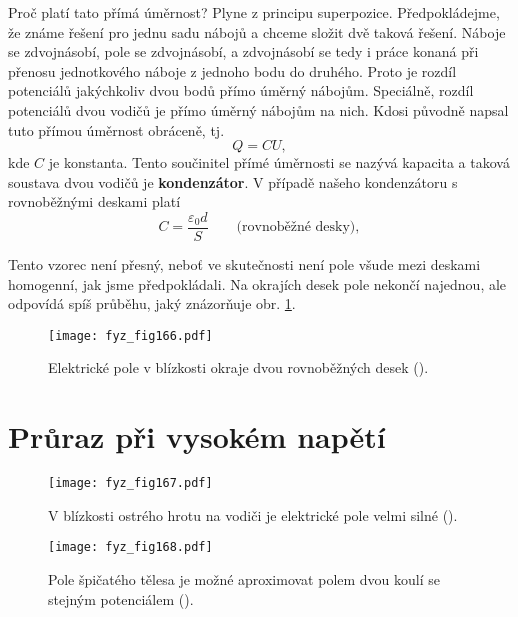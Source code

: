 {  Proč platí tato přímá úměrnost? Plyne z principu superpozice. Předpokládejme, že známe řešení pro 
  jednu sadu nábojů a chceme složit dvě taková řešení. Náboje se zdvojnásobí, pole se zdvojnásobí, 
  a zdvojnásobí se tedy i práce konaná při přenosu jednotkového náboje z jednoho bodu do druhého. 
  Proto je rozdíl potenciálů jakýchkoliv dvou bodů přímo úměrný nábojům. Speciálně, rozdíl 
  potenciálů dvou vodičů je přímo úměrný nábojům na nich. Kdosi původně napsal tuto přímou úměrnost 
  obráceně, tj.
  \begin{equation}\label{fyz:eq294}
    Q = CU,
  \end{equation}
  kde \(C\) je konstanta. Tento součinitel přímé úměrnosti se nazývá kapacita a taková soustava 
  dvou vodičů je \textbf{kondenzátor}. V případě našeho kondenzátoru s rovnoběžnými deskami platí
  \begin{equation}\label{fyz:eq295}
    C = \frac{\varepsilon_0d}{S} \qquad\text{(rovnoběžné desky)},
  \end{equation}
  
  Tento vzorec není přesný, neboť ve skutečnosti není pole všude mezi deskami homogenní, jak jsme 
  předpokládali. Na okrajích desek pole nekončí najednou, ale odpovídá spíš průběhu,
  jaký znázorňuje obr. \ref{fyz:fig166}.
  
  \begin{figure}[ht!]  %
    \centering
    \texttt{[image: fyz\_fig166.pdf]}
    \caption{Elektrické pole v blízkosti okraje dvou rovnoběžných desek
             (\cite[s.~115]{Feynman02}).}
    \label{fyz:fig166}
  \end{figure}
  
\section{Průraz při vysokém napětí}\label{fyz:IIchapVsecXX}

  \begin{figure}[ht!]  %
    \centering
    \texttt{[image: fyz\_fig167.pdf]}
    \caption{V blízkosti ostrého hrotu na vodiči je elektrické pole velmi silné
             (\cite[s.~116]{Feynman02}).}
    \label{fyz:fig167}
  \end{figure}
    
  \begin{figure}[ht!]  %
    \centering
    \texttt{[image: fyz\_fig168.pdf]}
    \caption{Pole špičatého tělesa je možné aproximovat polem dvou koulí se stejným potenciálem
             (\cite[s.~116]{Feynman02}).}
    \label{fyz:fig168}
  \end{figure}
  
}
